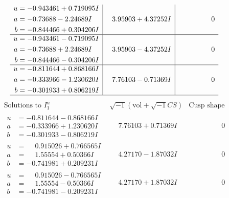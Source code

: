 \documentclass[1p]{elsarticle_modified}
\theoremstyle{definition}
\newcommand{\I}{\sqrt{-1}}
\begin{document}
$$\begin{array}{c|c|c}
\begin{aligned}
u &= -0.943461 + 0.719095 I \\
a &= -0.73688 - 2.24689 I \\
b &= -0.844466 + 0.304206 I\end{aligned}
 & \phantom{-}3.95903 + 4.37252 I & \phantom{-0.000000 } 0 \\ \hline\begin{aligned}
u &= -0.943461 - 0.719095 I \\
a &= -0.73688 + 2.24689 I \\
b &= -0.844466 - 0.304206 I\end{aligned}
 & \phantom{-}3.95903 - 4.37252 I & \phantom{-0.000000 } 0 \\ \hline\begin{aligned}
u &= -0.811644 + 0.868166 I \\
a &= -0.333966 - 1.230620 I \\
b &= -0.301933 + 0.806219 I\end{aligned}
 & \phantom{-}7.76103 - 0.71369 I & \phantom{-0.000000 } 0\\
 \hline 
 \end{array}$$\newpage$$\begin{array}{c|c|c}  
\text{Solutions to }I^u_{1}& \I (\text{vol} + \sqrt{-1}CS) & \text{Cusp shape}\\
 \hline 
\begin{aligned}
u &= -0.811644 - 0.868166 I \\
a &= -0.333966 + 1.230620 I \\
b &= -0.301933 - 0.806219 I\end{aligned}
 & \phantom{-}7.76103 + 0.71369 I & \phantom{-0.000000 } 0 \\ \hline\begin{aligned}
u &= \phantom{-}0.915026 + 0.766565 I \\
a &= \phantom{-}1.55554 + 0.50366 I \\
b &= -0.741981 + 0.209231 I\end{aligned}
 & \phantom{-}4.27170 - 1.87032 I & \phantom{-0.000000 } 0 \\ \hline\begin{aligned}
u &= \phantom{-}0.915026 - 0.766565 I \\
a &= \phantom{-}1.55554 - 0.50366 I \\
b &= -0.741981 - 0.209231 I\end{aligned}
 & \phantom{-}4.27170 + 1.87032 I & \phantom{-0.000000 } 0 \\ \hline\begin{aligned}

\end{aligned}
\end{array}$$
\end{document}
